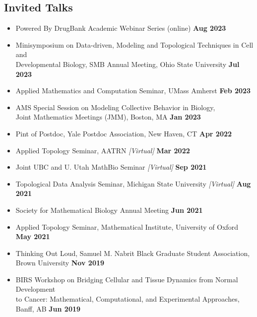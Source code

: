 \documentclass[margin,line]{res}
\begin{document}
\begin{resume}
\section{\sc Invited Talks}
{\renewcommand\leftmargini{0em}
\begin{itemize}
\setlength\itemsep{0.3em}
\item[] Powered By DrugBank Academic Webinar Series (online) \hfill {\bf Aug 2023}
\item[] Minisymposium on Data-driven, Modeling and Topological Techniques in Cell and \\Developmental Biology, SMB Annual Meeting, Ohio State University \hfill {\bf Jul 2023}
\item[] Applied Mathematics and Computation Seminar, UMass Amherst \hfill {\bf Feb 2023}
\item[] AMS Special Session on Modeling Collective Behavior in Biology, \\Joint Mathematics Meetings (JMM), Boston, MA \hfill {\bf Jan 2023}
\item[] Pint of Postdoc, Yale Postdoc Association, New Haven, CT \hfill {\bf Apr 2022}
\item[] Applied Topology Seminar, AATRN \textit{[Virtual]} \hfill {\bf Mar 2022}
\item[] Joint UBC and U. Utah MathBio Seminar \textit{[Virtual]} \hfill {\bf Sep 2021}
\item[] Topological Data Analysis Seminar, Michigan State University \textit{[Virtual]} \hfill {\bf Aug 2021}
\item[] Society for Mathematical Biology Annual Meeting \hfill {\bf Jun 2021}
\item[] Applied Topology Seminar, Mathematical Institute, University of Oxford \hfill {\bf May 2021}
\item[] Thinking Out Loud, Samuel M. Nabrit Black Graduate Student Association, \\ Brown University \hfill {\bf Nov 2019}
\item[] BIRS Workshop on Bridging Cellular and Tissue Dynamics from Normal Development \\ to Cancer: Mathematical, Computational, and Experimental Approaches, Banff, AB \hfill {\bf Jun 2019} 
\end{itemize}
}


\end{resume}
\end{document}
